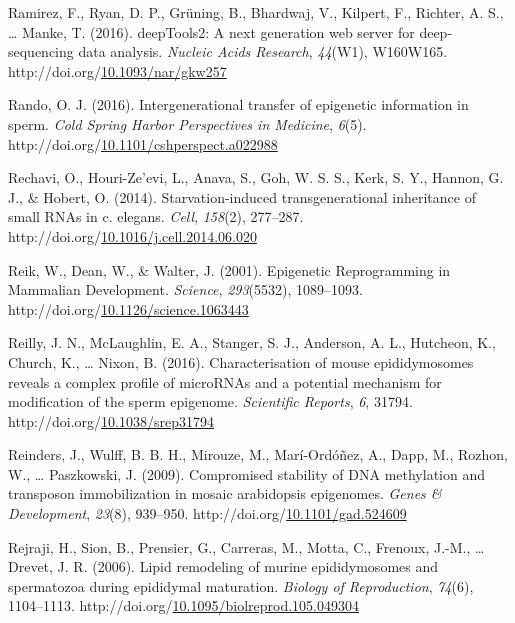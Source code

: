 \documentclass[12pt,twoside]{reedthesis}
\newlength{\cslhangindent}
\newenvironment{CSLReferences}[2] %
 {%
  \setlength{\parindent}{0pt}
  \ifodd #1 \everypar{\setlength{\hangindent}{\cslhangindent}}\ignorespaces\fi
  \ifnum #2 > 0
  \setlength{\parskip}{#2\baselineskip}
  \fi
 }%
 {}
\begin{document}
\begin{CSLReferences}{1}{0}
\leavevmode{}%
Ramirez, F., Ryan, D. P., Grüning, B., Bhardwaj, V., Kilpert, F., Richter, A. S., \ldots{} Manke, T. (2016). deepTools2: A next generation web server for deep-sequencing data analysis. \emph{Nucleic Acids Research}, \emph{44}(W1), W160W165. http://doi.org/\href{https://doi.org/10.1093/nar/gkw257}{10.1093/nar/gkw257}

\leavevmode{}%
Rando, O. J. (2016). Intergenerational transfer of epigenetic information in sperm. \emph{Cold Spring Harbor Perspectives in Medicine}, \emph{6}(5). http://doi.org/\href{https://doi.org/10.1101/cshperspect.a022988}{10.1101/cshperspect.a022988}

\leavevmode{}%
Rechavi, O., Houri-Ze'evi, L., Anava, S., Goh, W. S. S., Kerk, S. Y., Hannon, G. J., \& Hobert, O. (2014). Starvation-induced transgenerational inheritance of small RNAs in c. elegans. \emph{Cell}, \emph{158}(2), 277--287. http://doi.org/\href{https://doi.org/10.1016/j.cell.2014.06.020}{10.1016/j.cell.2014.06.020}

\leavevmode{}%
Reik, W., Dean, W., \& Walter, J. (2001). Epigenetic Reprogramming in Mammalian Development. \emph{Science}, \emph{293}(5532), 1089--1093. http://doi.org/\href{https://doi.org/10.1126/science.1063443}{10.1126/science.1063443}

\leavevmode{}%
Reilly, J. N., McLaughlin, E. A., Stanger, S. J., Anderson, A. L., Hutcheon, K., Church, K., \ldots{} Nixon, B. (2016). Characterisation of mouse epididymosomes reveals a complex profile of {microRNAs} and a potential mechanism for modification of the sperm epigenome. \emph{Scientific Reports}, \emph{6}, 31794. http://doi.org/\href{https://doi.org/10.1038/srep31794}{10.1038/srep31794}

\leavevmode{}%
Reinders, J., Wulff, B. B. H., Mirouze, M., Marí-Ordóñez, A., Dapp, M., Rozhon, W., \ldots{} Paszkowski, J. (2009). Compromised stability of DNA methylation and transposon immobilization in mosaic arabidopsis epigenomes. \emph{Genes \& Development}, \emph{23}(8), 939--950. http://doi.org/\href{https://doi.org/10.1101/gad.524609}{10.1101/gad.524609}

\leavevmode{}%
Rejraji, H., Sion, B., Prensier, G., Carreras, M., Motta, C., Frenoux, J.-M., \ldots{} Drevet, J. R. (2006). Lipid remodeling of murine epididymosomes and spermatozoa during epididymal maturation. \emph{Biology of Reproduction}, \emph{74}(6), 1104--1113. http://doi.org/\href{https://doi.org/10.1095/biolreprod.105.049304}{10.1095/biolreprod.105.049304}


\end{CSLReferences}
\end{document}
